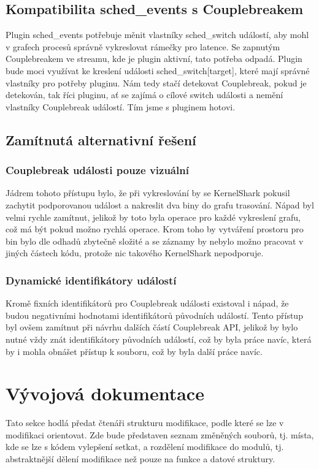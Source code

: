 \subsection{Kompatibilita sched\_events s Couplebreakem}
Plugin sched\_events potřebuje měnit vlastníky sched\_switch událostí, aby mohl v grafech procesů správně vykreslovat rámečky pro latence. Se zapnutým Couplebreakem ve streamu, kde je plugin aktivní, tato potřeba odpadá. Plugin bude moci využívat ke kreslení události sched\_switch[target], které mají správné vlastníky pro potřeby pluginu. Nám tedy stačí detekovat Couplebreak, pokud je detekován, tak říci pluginu, ať se zajímá o cílové switch události a nemění vlastníky Couplebreak událostí. Tím jsme s pluginem hotovi.

\subsection{Zamítnutá alternativní řešení}

\subsubsection*{Couplebreak události pouze vizuální}
Jádrem tohoto přístupu bylo, že při vykreslování by se KernelShark pokusil zachytit podporovanou událost a nakreslit dva biny do grafu trasování. Nápad byl velmi rychle zamítnut, jelikož by toto byla operace pro každé vykreslení grafu, což má být pokud možno rychlá operace. Krom toho by vytváření prostoru pro bin bylo dle odhadů zbytečně složité a se záznamy by nebylo možno pracovat v jiných částech kódu, protože nic takového KernelShark nepodporuje.

\subsubsection*{Dynamické identifikátory událostí}
Kromě fixních identifikátorů pro Couplebreak události existoval i nápad, že budou negativními hodnotami identifikátorů původních událostí. Tento přístup byl ovšem zamítnut při návrhu dalších částí Couplebreak API, jelikož by bylo nutné vždy znát identifikátory původních událostí, což by byla práce navíc, která by i mohla obnášet přístup k souboru, což by byla další práce navíc.

\section{Vývojová dokumentace}
Tato sekce hodlá předat čtenáři strukturu modifikace, podle které se lze v modifikaci orientovat. Zde bude představen seznam změněných souborů, tj. místa, kde se lze s kódem vylepšení setkat, a rozdělení modifikace do modulů, tj. abstraktnější dělení modifikace než pouze na funkce a datové struktury.

